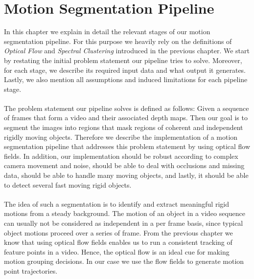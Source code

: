 \chapter{Motion Segmentation Pipeline}
In this chapter we explain in detail the relevant stages of our motion segmentation pipeline. For this purpose we heavily rely on the definitions of \textit{Optical Flow} and \textit{Spectral Clustering} introduced in the previous chapter. We start by restating the initial problem statement our pipeline tries to solve. Moreover, for each stage, we describe its required input data and what output it generates. Lastly, we also mention all assumptions and induced limitations for each pipeline stage. \\ \\
The problem statement our pipeline solves is defined as follows: Given a sequence of frames that form a video and their associated depth maps. Then our goal is to segment the images into regions that mask regions of coherent and independent rigidly moving objects. Therefore we describe the implementation of a motion segmentation pipeline that addresses this problem statement by using optical flow fields. In addition, our implementation should be robust according to complex camera movement and noise, should be able to deal with occlusions and missing data, should be able to handle many moving objects, and lastly, it should be able to detect several fast moving rigid objects. \\ \\
The idea of such a segmentation is to identify and extract meaningful rigid motions from a steady background. The motion of an object in a video sequence can usually not be considered as independent in a per frame basis, since typical object motions proceed over a series of frame. From the previous chapter we know that using optical flow fields enables us to run a consistent tracking of feature points in a video. Hence, the optical flow is an ideal cue for making motion grouping decisions. In our case we use the flow fields to generate motion point trajectories.
